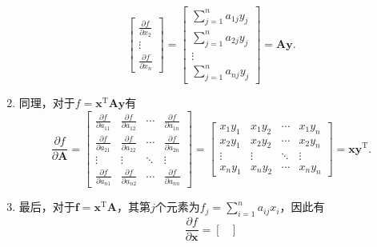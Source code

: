 \begin{solution}
\begin{enumerate}
\[\begin{bmatrix}
                      \frac{\partial f}{\partial x_2} \\
                      \vdots                          \\
                      \frac{\partial f}{\partial x_n}
                  \end{bmatrix} = \begin{bmatrix}
                      \sum_{j=1}^{n} a_{1j} y_j \\
                      \sum_{j=1}^{n} a_{2j} y_j \\
                      \vdots                    \\
                      \sum_{j=1}^{n} a_{nj} y_j
                  \end{bmatrix} = \mathbf{A} \bm{y}.
              \]
        \item 同理，对于\( f = \bm{x}^{\mathrm{T}} \mathbf{A} \bm{y} \)有
              \[
                  \frac{\partial f}{\partial \mathbf{A}} = \begin{bmatrix}
                      \frac{\partial f}{\partial a_{11}} & \frac{\partial f}{\partial a_{12}} & \cdots & \frac{\partial f}{\partial a_{1n}} \\
                      \frac{\partial f}{\partial a_{21}} & \frac{\partial f}{\partial a_{22}} & \cdots & \frac{\partial f}{\partial a_{2n}} \\
                      \vdots                             & \vdots                             & \ddots & \vdots                             \\
                      \frac{\partial f}{\partial a_{n1}} & \frac{\partial f}{\partial a_{n2}} & \cdots & \frac{\partial f}{\partial a_{nn}}
                  \end{bmatrix} = \begin{bmatrix}
                      x_1 y_1 & x_1 y_2 & \cdots & x_1 y_n \\
                      x_2 y_1 & x_2 y_2 & \cdots & x_2 y_n \\
                      \vdots  & \vdots  & \ddots & \vdots  \\
                      x_n y_1 & x_n y_2 & \cdots & x_n y_n
                  \end{bmatrix} = \bm{x} \bm{y}^{\mathrm{T}}.
              \]
        \item 最后，对于\( \bm{f} = \bm{x}^{\mathrm{T}} \mathbf{A} \)，其第\( j \)个元素为\( f_j = \sum_{i=1}^{n} a_{ij} x_i \)，因此有
              \[
                  \frac{\partial f}{\partial \bm{x}} = \begin{bmatrix}

\end{bmatrix}\]
\end{enumerate}
\end{solution}
